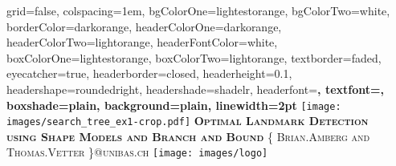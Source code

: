 \documentclass[portrait,final,a0paper,fontscale=0.277]{baposter}
\begin{document}


\begin{poster}%
  {
  grid=false,
  colspacing=1em,
  bgColorOne=lightestorange,
  bgColorTwo=white,
  borderColor=darkorange,
  headerColorOne=darkorange,
  headerColorTwo=lightorange,
  headerFontColor=white,
  boxColorOne=lightestorange,
  boxColorTwo=lightorange,
  textborder=faded,
  eyecatcher=true,
  headerborder=closed,
  headerheight=0.1\textheight,
  headershape=roundedright,
  headershade=shadelr,
  headerfont=\Large\bf\textsc, %
  textfont={\setlength{\parindent}{1.5em}},
  boxshade=plain,
  background=plain,
  linewidth=2pt
  }
  {\texttt{[image: images/search\_tree\_ex1-crop.pdf]}} 
  {\setlength{\baselineskip}{2ex}\bf\textsc{Optimal Landmark Detection\\ using Shape Models and Branch and Bound}\vspace{0.2em}}
  {\textsc{\{ Brian.Amberg and Thomas.Vetter \}@unibas.ch}}
  {
    \texttt{[image: images/logo]}
  }

    \newcommand{\colouredcircle}{%
      \tikz{\useasboundingbox (-0.2em,-0.32em) rectangle(0.2em,0.32em); \draw[draw=black,fill=lightblue,line width=0.03em] (0,0) circle(0.18em);}}


\end{poster}
\end{document}
